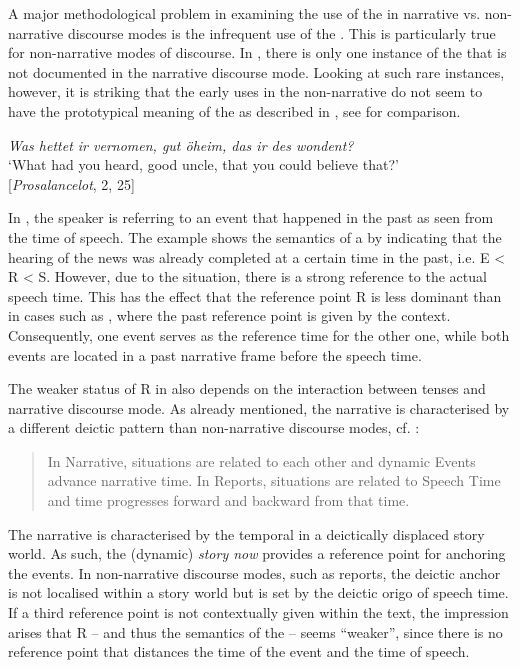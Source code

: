 \documentclass[output=paper,colorlinks,citecolor=brown]{langscibook}
\begin{document}
A major methodological problem in examining the use of the  in narrative vs. non-narrative discourse modes is the infrequent use of the . This is particularly true for non-narrative modes of discourse. In , there is only one instance of the  that is not documented in the narrative discourse mode. Looking at such rare instances, however, it is striking that the early uses in the non-narrative  do not seem to have the prototypical meaning of the  as described in , see  for comparison. 

\ea%
\label{ex:zeman:10}
{\itshape Was hettet ir vernomen, gut öheim, das ir des wondent?}\\
\glt ‘What had you heard, good uncle, that you could believe that?' \\
\hfill [\textit{Prosalancelot}, 2, 25]
\z 
 
In , the speaker is referring to an event that happened in the past as seen from the time of speech. The example shows the semantics of a  by indicating that the hearing of the news was already completed at a certain time in the past, i.e. E < R < S. However, due to the  situation, there is a strong reference to the actual speech time. This has the effect that the reference point R is less dominant than in cases such as , where the past reference point is given by the context. Consequently, one event serves as the reference time for the other one, while both events are located in a past narrative frame before the speech time. 

The weaker status of R in  also depends on the interaction between tenses and narrative discourse mode. As already mentioned, the narrative  is characterised by a different deictic pattern than non-narrative discourse modes, cf. \citet{Smith2003}: 

\begin{quote}
In Narrative, situations are related to each other and dynamic Events advance narrative time. In Reports, situations are related to Speech Time and time progresses forward and backward from that time. \citep[13]{Smith2003}
\end{quote}

The narrative  is characterised by the temporal  in a deictically displaced story world. As such, the (dynamic) \textit{story now} provides a reference point for anchoring the events. In non-narrative discourse modes, such as reports, the deictic anchor is not localised within a story world but is set by the deictic origo of speech time. If a third reference point is not contextually given within the text, the impression arises that R – and thus the semantics of the  – seems “weaker”, since there is no reference point that distances the time of the event and the time of speech. 
\end{document}

